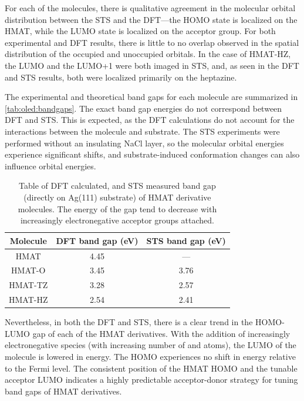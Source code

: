 For each of the molecules, there is qualitative agreement in the molecular orbital distribution between the \ac{STS} and the \ac{DFT}---the \ac{HOMO} state is localized on the \ac{HMAT}, while the \ac{LUMO} state is localized on the acceptor group. For both experimental and \ac{DFT} results, there is little to no overlap observed in the spatial distribution of the occupied and unoccupied orbitals. In the case of \ac{HMAT-HZ}, the LUMO and the LUMO+1 were both imaged in \ac{STS}, and, as seen in the \ac{DFT} and STS results, both were localized primarily on the heptazine. 


The experimental and theoretical band gaps for each molecule are summarized in \autoref{tab:oled:bandgaps}. The exact band gap energies do not correspond between \ac{DFT} and \ac{STS}. This is expected, as the \ac{DFT} calculations do not account for the interactions between the molecule and substrate. The \ac{STS} experiments were performed without an insulating NaCl layer, so the molecular orbital energies experience significant shifts, and substrate-induced conformation changes can also influence orbital energies.

\begin{table} [h]
\begin{center}
    \begin{tabular}{|c|c|c|} 
    \hline
        Molecule  &  DFT band gap (eV)  &  STS band gap (eV) \\
        \hline
        HMAT     &    4.45   &  --- \\
        HMAT-O   &    3.45   & 3.76 \\
        HMAT-TZ  &    3.28   & 2.57 \\
        HMAT-HZ  &    2.54   & 2.41 \\
        \hline
    \end{tabular}
    \caption{Table of DFT calculated, and STS measured band gap (directly on Ag(111) substrate) of HMAT derivative molecules. The energy of the gap tend to decrease with increasingly electronegative acceptor groups attached.}
    \label{tab:oled:bandgaps}
    \end{center}
\end{table}

Nevertheless, in both the \ac{DFT} and \ac{STS}, there is a clear trend in the HOMO-LUMO gap of each of the \ac{HMAT} derivatives. With the addition of increasingly electronegative species (with increasing number of  and  atoms), the \ac{LUMO} of the molecule is lowered in energy. The \ac{HOMO} experiences no shift in energy relative to the Fermi level. The consistent position of the HMAT HOMO and the tunable acceptor LUMO indicates a highly predictable acceptor-donor strategy for tuning band gaps of HMAT derivatives.

